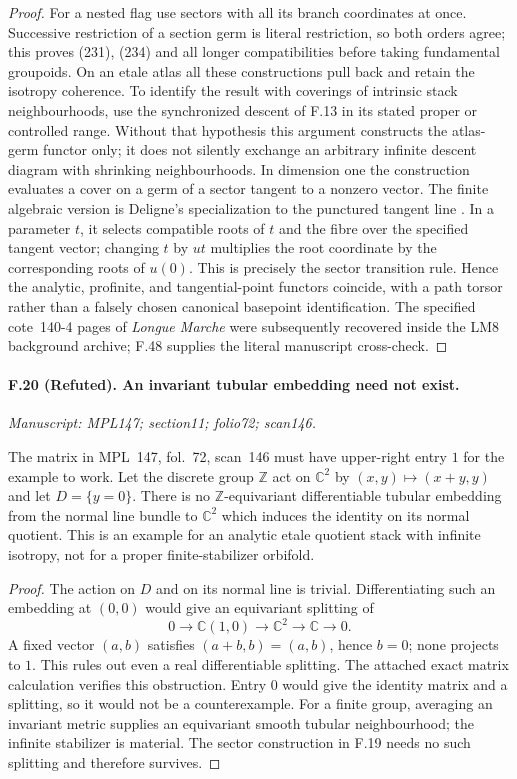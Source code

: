\begin{proof}
For a nested flag use sectors with all its branch coordinates at once.
Successive restriction of a section germ is literal restriction, so
both orders agree; this proves (231), (234) and all longer
compatibilities before taking fundamental groupoids. On an etale
atlas all these constructions pull back and retain the isotropy
coherence. To identify the result with coverings of intrinsic stack
neighbourhoods, use the synchronized descent of F.13 in its stated
proper or controlled range. Without that hypothesis this argument
constructs the atlas-germ functor only; it does not silently exchange
an arbitrary infinite descent diagram with shrinking neighbourhoods.
In dimension one the construction evaluates a cover on a germ of a
sector tangent to a nonzero vector. The finite algebraic version is
Deligne's specialization to the punctured tangent line
\cite[\S15.13--15.27]{Deligne1989}. In a parameter $t$, it selects
compatible roots of $t$ and the fibre over the specified tangent
vector; changing $t$ by $u t$ multiplies the root coordinate by the
corresponding roots of $u(0)$. This is precisely the sector transition
rule. Hence the analytic, profinite, and tangential-point functors
coincide, with a path torsor rather than a falsely chosen canonical
basepoint identification. The specified cote~140-4 pages of
\emph{Longue Marche} were subsequently recovered inside the LM8
background archive; F.48 supplies the literal manuscript cross-check.
\end{proof}

\paragraph{F.20 (Refuted). An invariant tubular
embedding need not exist.}
\textit{Manuscript: MPL147; section11; folio72; scan146.}

The matrix in MPL~147, fol.~72, scan~146 must have upper-right entry
$1$ for the example to work. Let the discrete group $\mathbb Z$ act
on $\mathbb C^2$ by $(x,y)\mapsto(x+y,y)$ and let $D=\{y=0\}$.
There is no $\mathbb Z$-equivariant differentiable tubular embedding
from the normal line bundle to $\mathbb C^2$ which induces the
identity on its normal quotient. This is an example for an analytic
etale quotient stack with infinite isotropy, not for a proper
finite-stabilizer orbifold.

\begin{proof}
The action on $D$ and on its normal line is trivial. Differentiating
such an embedding at $(0,0)$ would give an equivariant splitting of
\[
 0\longrightarrow\mathbb C(1,0)\longrightarrow\mathbb C^2
       \longrightarrow\mathbb C\longrightarrow0.
\]
A fixed vector $(a,b)$ satisfies $(a+b,b)=(a,b)$, hence $b=0$;
none projects to $1$. This rules out even a real differentiable
splitting. The attached exact matrix calculation verifies this
obstruction. Entry $0$ would give the identity matrix and a splitting,
so it would not be a counterexample. For a finite group, averaging
an invariant metric supplies an equivariant smooth tubular
neighbourhood; the infinite stabilizer is material. The sector
construction in F.19 needs no such splitting and therefore survives.
\end{proof}

